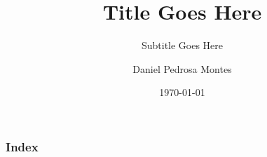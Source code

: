 \documentclass{beamer}
\title{Title Goes Here}
\subtitle{Subtitle Goes Here}
\author{Daniel Pedrosa Montes}
\institute{Universidad de Granada}
\date{\today}
\begin{document}
	\begin{frame}
		\titlepage
	\end{frame}

	\begin{frame}
		\frametitle{Index}
		\tableofcontents
	\end{frame}

	
\end{document}
